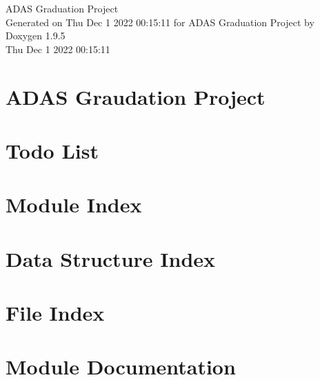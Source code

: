 \documentclass[twoside]{book}
\newcommand{\+}{\discretionary{\mbox{\scriptsize$\hookleftarrow$}}{}{}}
\newcommand{\clearemptydoublepage}{%
    \newpage{\pagestyle{empty}\cleardoublepage}%
  }
\begin{document}
  \raggedbottom
    \hypersetup{pageanchor=false,
                bookmarksnumbered=true,
                pdfencoding=unicode
               }
  \begin{titlepage}
  \vspace*{7cm}
  \begin{center}%
  {\Large ADAS Graduation Project}\\
  \vspace*{1cm}
  {\large Generated on Thu Dec 1 2022 00\+:15\+:11 for ADAS Graduation Project by Doxygen 1.9.5}\\
    \vspace*{0.5cm}
    {\small Thu Dec 1 2022 00:15:11}
  \end{center}
  \end{titlepage}
  \clearemptydoublepage
  \tableofcontents
  \clearemptydoublepage
  \hypersetup{pageanchor=true}
\chapter{ADAS Graudation Project}
\label{index}\hypertarget{index}{}
\chapter{Todo List}
\label{todo}

\chapter{Module Index}

\chapter{Data Structure Index}

\chapter{File Index}

\chapter{Module Documentation}























\end{document}
